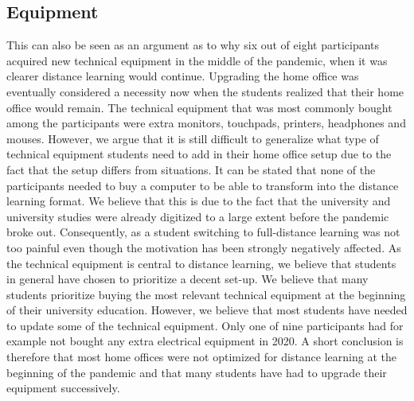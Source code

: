 \documentclass{sigchi}
\begin{document}
\subsection{Equipment}
This can also be seen as an argument as to why six out of eight participants acquired new technical equipment in the middle of the pandemic, when it was clearer distance learning would continue. Upgrading the home office was eventually considered a necessity now when the students realized that their home office would remain. The technical equipment that was most commonly bought among the participants were extra monitors, touchpads, printers, headphones and mouses. However, we argue that it is still difficult to generalize what type of technical equipment students need to add in their home office setup due to the fact that the setup differs from situations. It can be stated that none of the participants needed to buy a computer to be able to transform into the distance learning format. We believe that this is due to the fact that the university and university studies were already digitized to a large extent before the pandemic broke out. Consequently, as a student switching to full-distance learning was not too painful even though the motivation has been strongly negatively affected. As the technical equipment is central to distance learning, we believe that students in general have chosen to prioritize a decent set-up. We believe that many students prioritize buying the most relevant technical equipment at the beginning of their university education. However, we believe that most students have needed to update some of the technical equipment. Only one of nine participants had for example not bought any extra electrical equipment in 2020. A short conclusion is therefore that most home offices were not optimized for distance learning at the beginning of the pandemic and that many students have had to upgrade their equipment successively.
\end{document}
